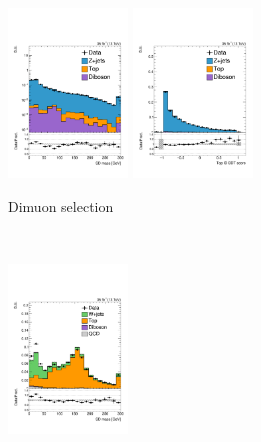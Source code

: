 \begin{figure}[]
    \begin{center}
        \begin{subfigure}[t]{\textwidth}
    \begin{center}
            \includegraphics[width=0.35\textwidth]{figures/toptagging/sf/dimuon_fjMSD_logy.pdf}
            \includegraphics[width=0.35\textwidth]{figures/toptagging/sf/dimuon_top_ecf_bdt.pdf}
            \caption{Dimuon selection}
    \end{center}
        \end{subfigure} \\ 
        \begin{subfigure}[t]{\textwidth}
    \begin{center}
            \includegraphics[width=0.35\textwidth]{figures/toptagging/sf/singlemuontop_fjMSD.pdf}

\end{center}
\end{subfigure}
\end{center}
\end{figure}
